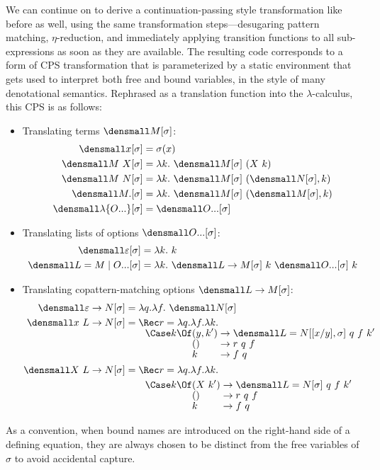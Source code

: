 We can continue on to derive a continuation-passing style transformation like
before as well, using the same transformation steps---desugaring pattern
matching, $\eta$-reduction, and immediately applying transition functions to all
sub-expressions as soon as they are available.  The resulting code corresponds
to a form of CPS transformation that is parameterized by a static environment
that gets used to interpret both free and bound variables, in the style of many
denotational semantics.  Rephrased as a translation function into the
$\lambda$-calculus, this CPS is as follows:
\begin{itemize}
\item Translating terms $\den{M}[\sigma]$:
\begin{align*}
  \den{x}[\sigma] &= \sigma(x)
  \\
  \den{M~X}[\sigma] &= \lambda k.~ \den{M}[\sigma] ~ (X ~ k)
  \\
  \den{M~N}[\sigma] &= \lambda k.~ \den{M}[\sigma] ~ (\den{N}[\sigma], k)
  \\
  \den{M.}[\sigma] &= \lambda k.~ \den{M}[\sigma] ~ (\den{M}[\sigma], k)
  \\
  \den{\lambda\{\many{O}\}}[\sigma] &= \den{\many{O}}[\sigma]
\end{align*}
\item Translating lists of options $\den{\many{O}}[\sigma]$:
\begin{align*}
  \den{\varepsilon}[\sigma] &= \lambda k.~ k
  \\
  \den{L = M \mid \many{O}}[\sigma]
  &=
  \lambda k.~ \den{L \to M}[\sigma] ~ k ~ \den{\many{O}}[\sigma] ~ k
\end{align*}
\item Translating copattern-matching options $\den{L \to M}[\sigma]$:
\begin{align*}
  \den{\varepsilon \to N}[\sigma] &= \lambda q. \lambda f.~ \den{N}[\sigma]
  \\
  \den{x ~ L \to N}[\sigma] &= \Rec r = \lambda q. \lambda f. \lambda k.
  \\[-1ex]
  &\qquad
  \Case k \Of
  \begin{alignedat}[t]{2}
    &(y, k') &&\to \den{L = N}[\subst{y}{x},\sigma] ~ q ~ f ~ k'
    \\[-1ex]
    &() &&\to r ~ q ~ f
    \\[-1ex]
    &k &&\to f ~ q
  \end{alignedat}
  \\
  \den{X ~ L \to N}[\sigma] &= \Rec r = \lambda q. \lambda f. \lambda k.
  \\
  &\qquad
  \Case k \Of
  \begin{alignedat}[t]{2}
    &(X ~ k') &&\to \den{L = N}[\sigma] ~ q ~ f ~ k'
    \\[-1ex]
    &() &&\to r ~ q ~ f
    \\[-1ex]
    &k &&\to f ~ q
  \end{alignedat}
\end{align*}
\end{itemize}
As a convention, when bound names are introduced on the right-hand side of a
defining equation, they are always chosen to be distinct from the free variables
of $\sigma$ to avoid accidental capture.

